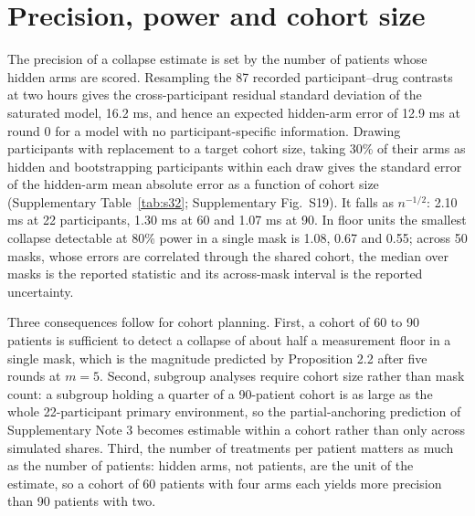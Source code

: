 \documentclass[11pt,a4paper]{article}
\begin{document}
\section{Precision, power and cohort size}
The precision of a collapse estimate is set by the number of patients whose hidden arms are scored. Resampling the 87 recorded participant--drug contrasts at two hours gives the cross-participant residual standard deviation of the saturated model, 16.2 ms, and hence an expected hidden-arm error of 12.9 ms at round 0 for a model with no participant-specific information. Drawing participants with replacement to a target cohort size, taking 30\% of their arms as hidden and bootstrapping participants within each draw gives the standard error of the hidden-arm mean absolute error as a function of cohort size (Supplementary Table~\ref{tab:s32}; Supplementary Fig.~S19). It falls as $n^{-1/2}$: 2.10 ms at 22 participants, 1.30 ms at 60 and 1.07 ms at 90. In floor units the smallest collapse detectable at 80\% power in a single mask is 1.08, 0.67 and 0.55; across 50 masks, whose errors are correlated through the shared cohort, the median over masks is the reported statistic and its across-mask interval is the reported uncertainty.

Three consequences follow for cohort planning. First, a cohort of 60 to 90 patients is sufficient to detect a collapse of about half a measurement floor in a single mask, which is the magnitude predicted by Proposition 2.2 after five rounds at $m=5$. Second, subgroup analyses require cohort size rather than mask count: a subgroup holding a quarter of a 90-patient cohort is as large as the whole 22-participant primary environment, so the partial-anchoring prediction of Supplementary Note 3 becomes estimable within a cohort rather than only across simulated shares. Third, the number of treatments per patient matters as much as the number of patients: hidden arms, not patients, are the unit of the estimate, so a cohort of 60 patients with four arms each yields more precision than 90 patients with two.
\end{document}
